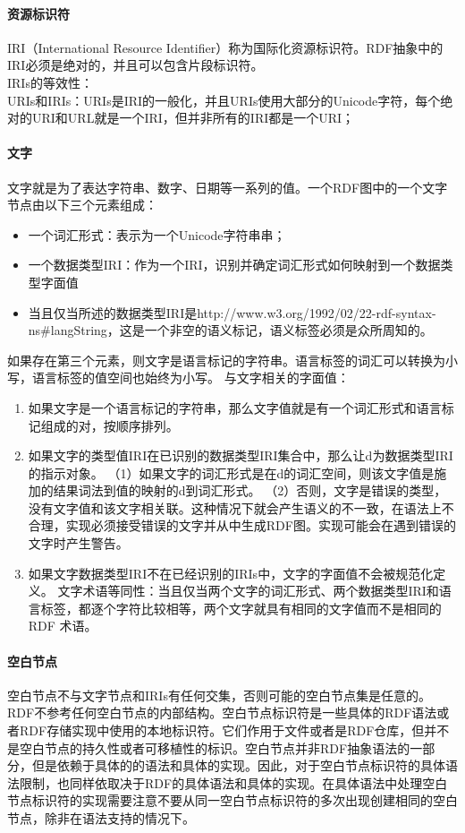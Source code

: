     \paragraph{资源标识符}
    \indent
    IRI（International Resource Identifier）称为国际化资源标识符。RDF抽象中的IRI必须是绝对的，并且可以包含片段标识符。\\
    IRIs的等效性：\\
    URIs和IRIs：URIs是IRI的一般化，并且URIs使用大部分的Unicode字符，每个绝对的URI和URL就是一个IRI，但并非所有的IRI都是一个URI；
    \paragraph{文字}
    文字就是为了表达字符串、数字、日期等一系列的值。一个RDF图中的一个文字节点由以下三个元素组成：
    \begin{itemize}
    \item 一个词汇形式：表示为一个Unicode字符串串；
    \item 一个数据类型IRI：作为一个IRI，识别并确定词汇形式如何映射到一个数据类型字面值
    \item 当且仅当所述的数据类型IRI是http://www.w3.org/1992/02/22-rdf-syntax-ns\#langString，这是一个非空的语义标记，语义标签必须是众所周知的。
    \end{itemize}
    \indent
    如果存在第三个元素，则文字是语言标记的字符串。语言标签的词汇可以转换为小写，语言标签的值空间也始终为小写。
    与文字相关的字面值：\\
    \begin{enumerate}
    \item 如果文字是一个语言标记的字符串，那么文字值就是有一个词汇形式和语言标记组成的对，按顺序排列。
    \item 如果文字的类型值IRI在已识别的数据类型IRI集合中，那么让d为数据类型IRI的指示对象。
    \subitem （1）如果文字的词汇形式是在d的词汇空间，则该文字值是施加的结果词法到值的映射的d到词汇形式。
    \subitem（2）否则，文字是错误的类型，没有文字值和该文字相关联。这种情况下就会产生语义的不一致，在语法上不合理，实现必须接受错误的文字并从中生成RDF图。实现可能会在遇到错误的文字时产生警告。
    \item 如果文字数据类型IRI不在已经识别的IRIs中，文字的字面值不会被规范化定义。
          文字术语等同性：当且仅当两个文字的词汇形式、两个数据类型IRI和语言标签，都逐个字符比较相等，两个文字就具有相同的文字值而不是相同的RDF 术语。

    \end{enumerate}
    \paragraph{空白节点}
    \indent
    空白节点不与文字节点和IRIs有任何交集，否则可能的空白节点集是任意的。RDF不参考任何空白节点的内部结构。空白节点标识符是一些具体的RDF语法或者RDF存储实现中使用的本地标识符。它们作用于文件或者是RDF仓库，但并不是空白节点的持久性或者可移植性的标识。空白节点并非RDF抽象语法的一部分，但是依赖于具体的的语法和具体的实现。因此，对于空白节点标识符的具体语法限制，也同样依取决于RDF的具体语法和具体的实现。在具体语法中处理空白节点标识符的实现需要注意不要从同一空白节点标识符的多次出现创建相同的空白节点，除非在语法支持的情况下。
